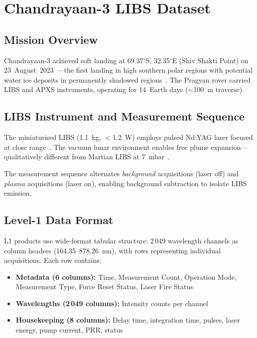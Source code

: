 \documentclass[a4paper,twocolumn,10pt]{article}
\begin{document}
\section{Chandrayaan-3 LIBS Dataset}
\label{sec:data}

\subsection{Mission Overview}

Chandrayaan-3 achieved soft landing at 69.37$^\circ$S, 32.35$^\circ$E
(Shiv Shakti Point) on 23~August~2023~\cite{ISROCh3}---the first landing
in high southern polar regions with potential water ice deposits in
permanently shadowed regions~\cite{Colaprete2010,Li2018}. The Pragyan
rover carried LIBS and APXS instruments, operating for 14~Earth days
($\sim$100~m traverse).

\subsection{LIBS Instrument and Measurement Sequence}

The miniaturised LIBS (1.1~kg, $<$1.2~W) employs pulsed Nd:YAG laser
focused at close range~\cite{Laxmiprasad2020}. The vacuum lunar
environment enables free plume expansion---qualitatively different from
Martian LIBS at 7~mbar~\cite{Knight2000,Saeidfirozeh2024}.

The measurement sequence alternates \emph{background} acquisitions
(laser off) and \emph{plasma} acquisitions (laser on), enabling
background subtraction to isolate LIBS emission.

\subsection{Level-1 Data Format}

L1 products use wide-format tabular structure: 2\,049 wavelength channels
as column headers (164.35--878.26~nm), with rows representing individual
acquisitions. Each row contains:
\begin{itemize}[nosep,leftmargin=*]
  \item \textbf{Metadata (6 columns):} Time, Measurement Count, Operation
    Mode, Measurement Type, Force Reset Status, Laser Fire Status
  \item \textbf{Wavelengths (2\,049 columns):} Intensity counts per channel
  \item \textbf{Housekeeping (8 columns):} Delay time, integration time,
    pulses, laser energy, pump current, PRR, status
\end{itemize}
\end{document}
